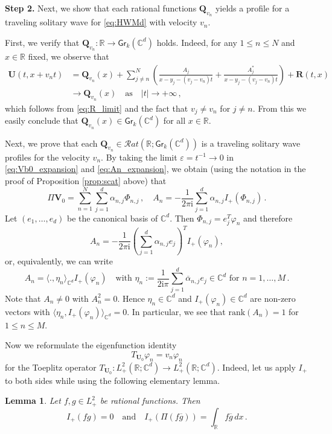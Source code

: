 \documentclass[11pt,reqno]{amsart}
\newtheorem{lem}{Lemma}[section]
\theoremstyle{definition}
\theoremstyle{remark}
\theoremstyle{remark}
\numberwithin{equation}{section}
\newcommand{\C}{\mathbb{C}}
\newcommand{\R}{\mathbb{R}}
\newcommand{\ov}{\overline}
\newcommand{\rank}{\mathrm{rank}}
\newcommand{\Qv}{\mathbf{Q}}
\newcommand{\eps}{\varepsilon}
\newcommand{\ii}{\mathrm{i}}
\newcommand{\Vb}{\mathbf{V}}
\newcommand{\Ub}{\mathbf{U}}
\newcommand{\Gr}{\mathsf{Gr}}
\renewcommand{\phi}{\varphi}
\begin{document}
\medskip
\textbf{Step 2.} Next, we show that each rational functions $\Qv_{v_n}$ yields a profile for a traveling solitary wave for \eqref{eq:HWMd} with velocity $v_n$.

First, we verify that $\Qv_{v_n} : \R \to \Gr_k(\C^d)$ holds. Indeed, for any $1 \leq n \leq N$ and $x \in \R$ fixed, we observe that
\begin{align*}
\Ub(t,x + v_n t) & = \Qv_{v_n}(x) + \sum_{j \neq n}^N \left ( \frac{A_j}{x-y_j-(v_j-v_n)t} + \frac{A_j^*}{x-y_j - (v_j -v_n)t} \right ) + \mathbf{R}(t,x) \\
& \to \Qv_{v_n}(x)  \quad \mbox{as} \quad |t| \to +\infty \, ,
\end{align*}
which follows from \eqref{eq:R_limit} and the fact that $v_j \neq v_n$ for $j \neq n$. From this we easily conclude that $\Qv_{v_n}(x) \in \Gr_k(\C^d)$ for all $x \in \R$.

Next, we prove that each $\Qv_{v_n} \in \mathcal{R}at(\R; \Gr_k(\C^d))$ is a traveling solitary wave profiles for the velocity $v_n$. By taking the limit $\eps = t^{-1} \to 0$ in \eqref{eq:Vb0_expansion} and \eqref{eq:An_expansion}, we obtain (using the notation in the proof of Proposition \ref{prop:scat} above) that
$$
\Pi \Vb_0=\sum_{n=1}^N \sum_{j=1}^d \alpha_{n,j}\Phi_{n,j}\, , \quad A_n = -\frac{1}{2\pi \ii}\sum_{j=1}^d \alpha_{n,j}I_+(\Phi_{n,j})\, .
$$
Let $(e_1,\dots,e_d)$ be the canonical basis of $\C^d$. Then $\Phi_{n,j}=e_j^T \phi_n$ and therefore
$$A_n =-\frac{1}{2\pi \ii}\left (\sum_{j=1}^d \alpha_{n,j}e_j\right )^T I_+(\varphi_n),$$
or, equivalently, we can write
$$
A_n=\langle .,\eta_n\rangle_{\C^d} I_+(\varphi_n) \quad \mbox{with $\eta_n:=\displaystyle \frac{1}{2\ii \pi}\sum_{j=1}^d \overline \alpha_{n,j}e_j \in \C^d$ for $n=1, \ldots, M$} \, .
$$
Note that $A_n \neq 0$ with $A_n^2 = 0$. Hence $\eta_n \in \C^d$ and $I_+(\varphi_n) \in \C^d$ are non-zero vectors with $\langle \eta_n, I_+(\phi_n) \rangle_{\C^d} = 0$. In particular, we see that $\rank(A_n) = 1$ for $1 \leq n \leq M$.

Now we reformulate the eigenfunction identity 
$$
T_{\Ub_0} \varphi_n =v_n \varphi_n 
$$ 
for the Toeplitz operator $T_{\Ub_0} : L^2_+(\R; \C^d) \to L^2_+(\R; \C^d)$. Indeed, let us apply $I_+$ to both sides while using the following elementary lemma.

\begin{lem} \label{lem:super_simple}
Let $f,g\in L^2_+$ be rational functions. Then
$$I_+(fg)=0 \quad \mbox{and} \quad I_+(\Pi (f\overline g))= \int_{\R} f \ov{g} \, dx  \, .$$
\end{lem}
\end{document}
